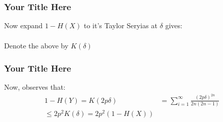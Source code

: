 \documentclass{beamer}
\begin{document}
\begin{frame}
  \frametitle{Your Title Here}
Now expand $ 1 - H(X)$ to it's Taylor Seryias at $\delta$ gives: 
\begin{equation*}
  \begin{split}
  \end{split}
\end{equation*}

Denote the above by $K(\delta)$

\end{frame}


\begin{frame}
  \frametitle{Your Title Here}
  Now, observes that: 
  \begin{equation*}
    \begin{split}
      1 - H(Y) = K(2p \delta) &= \sum_{ i =1 }^{\infty} \frac{(2 p\delta)^{2n} }{ 2n(2n-1)  }\\
      \le 2p^{2}K(\delta) = 2p^{2}( 1 - H(X) )
    \end{split}
  \end{equation*}
\end{frame}  
\end{document}

